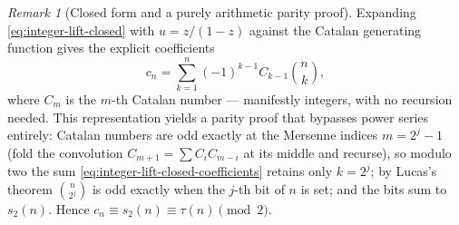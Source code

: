 \documentclass[11pt,oneside]{article}
\numberwithin{equation}{section}
\theoremstyle{definition}
\theoremstyle{remark}
\newtheorem{remark}[theorem]{Remark}
\begin{document}
\begin{remark}[Closed form and a purely arithmetic parity proof]
\label{rem:integer-lift-closed-form}
Expanding \eqref{eq:integer-lift-closed} with
\(u=z/(1-z)\) against the Catalan generating function gives the
explicit coefficients
\begin{equation}
  c_n=\sum_{k=1}^{n}(-1)^{k-1}C_{k-1}\binom nk,
  \label{eq:integer-lift-closed-coefficients}
\end{equation}
where \(C_m\) is the \(m\)-th Catalan number --- manifestly
integers, with no recursion needed.  This representation yields a
parity proof that bypasses power series entirely: Catalan numbers are
odd exactly at the Mersenne indices \(m=2^j-1\) (fold the
convolution \(C_{m+1}=\sum C_iC_{m-i}\) at its middle and recurse),
so modulo two the sum \eqref{eq:integer-lift-closed-coefficients}
retains only \(k=2^j\); by Lucas's theorem
\(\binom n{2^j}\) is odd exactly when the \(j\)-th bit of \(n\)
is set; and the bits sum to \(s_2(n)\).  Hence
\(c_n\equiv s_2(n)\equiv\tau(n)\pmod2\).
\end{remark}
\end{document}
